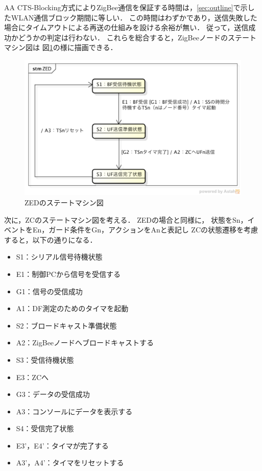 \documentclass[12pt]{jreport}
\begin{document}
AA CTS-Blocking方式によりZigBee通信を保証する時間は，\ref{sec:outline}で示したWLAN通信ブロック期間に等しい．
この時間はわずかであり，送信失敗した場合にタイムアウトによる再送の仕組みを設ける余裕が無い．
従って，送信成功かどうかの判定は行わない．
これらを総合すると，ZigBeeノードのステートマシン図は
図\ref{fig:zed_state}の様に描画できる． \\

\begin{figure}[bt]
 \centering
 \includegraphics[width=\columnwidth]{figure/zed_state.pdf}
 \caption{ZEDのステートマシン図}
 \label{fig:zed_state}
\end{figure}

次に，ZCのステートマシン図を考える．
ZEDの場合と同様に，
状態をSn，イベントをEn，ガード条件をGn，アクションをAnと表記し
ZCの状態遷移を考慮すると，以下の通りになる．

\begin{itemize}
 \item S1：シリアル信号待機状態
 \item E1：制御PCから信号を受信する
 \item G1：信号の受信成功
 \item A1：DF測定のためのタイマを起動
 \item S2：ブロードキャスト準備状態
 \item A2：ZigBeeノードへブロードキャストする
 \item S3：受信待機状態
 \item E3：ZCへ
 \item G3：データの受信成功
 \item A3：コンソールにデータを表示する
 \item S4：受信完了状態
 \item E3'，E4'：タイマが完了する
 \item A3'，A4'：タイマをリセットする
\end{itemize}
\end{document}
